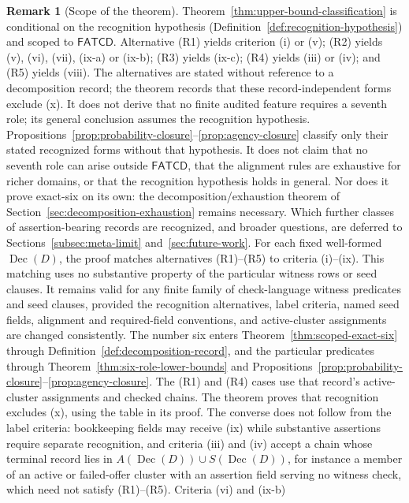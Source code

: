 \documentclass[11pt]{article}
\theoremstyle{definition}
\newtheorem{remark}[theorem]{Remark}
\newcommand{\FATCD}{\ensuremath{\mathsf{FATCD}}}
\newcommand{\Dec}[1]{\ensuremath{\operatorname{Dec}\!\left(#1\right)}}
\begin{document}
\begin{remark}[Scope of the theorem]\label{rem:classification-scope}
Theorem~\ref{thm:upper-bound-classification} is conditional on the recognition
hypothesis (Definition~\ref{def:recognition-hypothesis}) and scoped to \FATCD{}.
Alternative (R1) yields criterion (i) or (v); (R2) yields (v), (vi),
(vii), (ix-a) or (ix-b); (R3) yields (ix-c); (R4) yields (iii) or (iv); and
(R5) yields (viii). The alternatives are stated without reference to a
decomposition record; the theorem records that these
record-independent forms exclude (x). It does not derive that no finite audited feature requires a seventh role; its general conclusion assumes the recognition hypothesis. Propositions~\ref{prop:probability-closure}--\ref{prop:agency-closure} classify only their stated recognized forms without that hypothesis. It does
not claim that no seventh role can arise outside \FATCD{}, that the alignment
rules are exhaustive for richer domains, or that the recognition hypothesis holds
in general. Nor does it prove exact-six on its own: the decomposition/exhaustion
theorem of Section~\ref{sec:decomposition-exhaustion} remains necessary. Which further
classes of assertion-bearing records are recognized, and broader questions, are deferred to
Sections~\ref{subsec:meta-limit} and~\ref{sec:future-work}.
For each fixed well-formed \(\Dec{D}\), the proof matches alternatives
(R1)--(R5) to criteria (i)--(ix). This matching uses no substantive
property of the particular witness rows or seed clauses. It remains
valid for any finite family of check-language witness predicates and
seed clauses, provided the recognition alternatives, label criteria,
named seed fields, alignment and required-field conventions, and
active-cluster assignments are changed consistently. The number six enters
Theorem~\ref{thm:scoped-exact-six} through
Definition~\ref{def:decomposition-record}, and the particular predicates
through Theorem~\ref{thm:six-role-lower-bounds} and
Propositions~\ref{prop:probability-closure}--\ref{prop:agency-closure}. The (R1) and (R4) cases use that record's
active-cluster assignments and checked chains. The theorem proves that recognition excludes (x), using the table in its
proof. The converse does not follow from the label criteria: bookkeeping fields
may receive (ix) while substantive assertions require separate recognition,
and criteria (iii) and (iv) accept a chain whose terminal record lies in \(A(\Dec{D})\cup S(\Dec{D})\), for instance a member of an active or failed-offer cluster with an assertion field serving no witness check, which need not satisfy (R1)--(R5). Criteria (vi) and (ix-b)

\end{remark}
\end{document}
